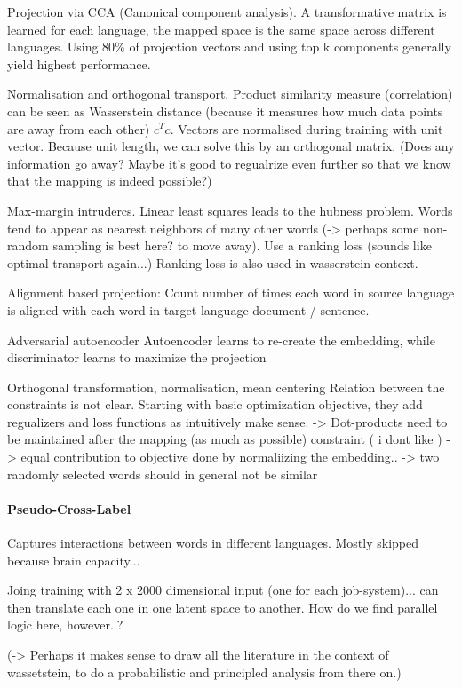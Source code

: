 \documentclass[a4paper,12pt,twoside,openright]{report}
\begin{document}
Projection via CCA (Canonical component analysis).
A transformative matrix is learned for each language, the mapped space is the same space across different languages.
Using 80\% of projection vectors and using top k components generally yield highest performance.

Normalisation and orthogonal transport.
Product similarity measure (correlation) can be seen as Wasserstein distance (because it measures how much data points are away from each other) $c^Tc$.
Vectors are normalised during training with unit vector.
Because unit length, we can solve this by an orthogonal matrix.
(Does any information go away? Maybe it's good to regualrize even further so that we know that the mapping is indeed possible?)

Max-margin intrudercs.
Linear least squares leads to the hubness problem. 
Words tend to appear as nearest neighbors of many other words
(-> perhaps some non-random sampling is best here? to move away).
Use a ranking loss (sounds like optimal transport again...)
Ranking loss is also used in wasserstein context.

Alignment based projection:
Count number of times each word in source language is aligned with each word in target language document / sentence.

Adversarial autoencoder
Autoencoder learns to re-create the embedding, while discriminator learns to maximize the projection

Orthogonal transformation, normalisation, mean centering
Relation between the constraints is not clear.
Starting with basic optimization objective, they add regualizers and loss functions as intuitively make sense.
-> Dot-products need to be maintained after the mapping (as much as possible) constraint ( i dont like )
-> equal contribution to objective done by normaliizing the embedding..
-> two randomly selected words should in general not be similar

\paragraph{Pseudo-Cross-Label}
Captures interactions between words in different languages.
Mostly skipped because brain capacity...

Joing training with 2 x 2000 dimensional input (one for each job-system)... can then translate each one in one latent space to another.
How do we find parallel logic here, however..?


(-> Perhaps it makes sense to draw all the literature in the context of wassetstein, to do a probabilistic and principled analysis from there on.)
\end{document}
